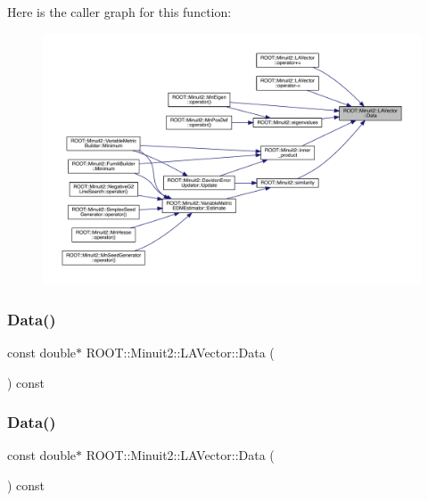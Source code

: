 Here is the caller graph for this function\+:
\nopagebreak
\begin{figure}[H]
\begin{center}
\leavevmode
\includegraphics[width=350pt]{d3/d20/classROOT_1_1Minuit2_1_1LAVector_a22e21b176e4d63740045edb4c12fe0a3_icgraph}
\end{center}
\end{figure}
\mbox{\label{classROOT_1_1Minuit2_1_1LAVector_a22e21b176e4d63740045edb4c12fe0a3}} 
\subsubsection{\texorpdfstring{Data()}{Data()}\hspace{0.1cm}{\footnotesize\ttfamily [2/6]}}
{\footnotesize\ttfamily const double$\ast$ R\+O\+O\+T\+::\+Minuit2\+::\+L\+A\+Vector\+::\+Data (\begin{DoxyParamCaption}{ }\end{DoxyParamCaption}) const\hspace{0.3cm}{\ttfamily [inline]}}

\mbox{\label{classROOT_1_1Minuit2_1_1LAVector_a22e21b176e4d63740045edb4c12fe0a3}} 
\subsubsection{\texorpdfstring{Data()}{Data()}\hspace{0.1cm}{\footnotesize\ttfamily [3/6]}}
{\footnotesize\ttfamily const double$\ast$ R\+O\+O\+T\+::\+Minuit2\+::\+L\+A\+Vector\+::\+Data (\begin{DoxyParamCaption}{ }\end{DoxyParamCaption}) const\hspace{0.3cm}{\ttfamily [inline]}}

